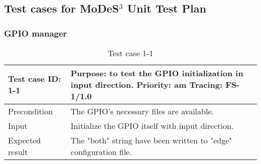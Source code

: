 \appendix
\chapter*{\fuggelek}
\setcounter{chapter}{\appendixnumber}

\section{Test cases for MoDeS$^3$ Unit Test Plan} \label{appendix:UnitTC}

\subsection{GPIO manager}
\begin{table}[H]
	\caption{Test case 1-1}
	\label{table:TCase-FS1-1}
	\begin{center}
		\renewcommand{\arraystretch}{1.8}
		\begin{tabu} 
			to 0.9 \textwidth
			{  X[0.3, l] X[l] }
			\toprule
			Test case ID: 1-1 & Purpose: to test the GPIO initialization in input direction. \newline Priority: am \newline Tracing: FS-1/1.0 \\ \midrule
			Precondition      & The GPIO's necessary files are available.                                                                     \\
			Input             & Initialize the GPIO itself with input direction.                                                              \\
			Expected result   & The "both" string have been written to "edge" configuration file.                                             \\ \bottomrule
		\end{tabu}
	\end{center}
\end{table} 

